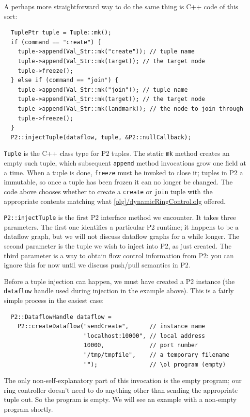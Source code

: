 \documentclass{article}
\begin{document}
A perhaps more straightforward way to do the same thing is C++ code of
this sort:
\begin{verbatim}
  TuplePtr tuple = Tuple::mk();
  if (command == "create") {
    tuple->append(Val_Str::mk("create")); // tuple name
    tuple->append(Val_Str::mk(target)); // the target node
    tuple->freeze();
  } else if (command == "join") {
    tuple->append(Val_Str::mk("join")); // tuple name
    tuple->append(Val_Str::mk(target)); // the target node
    tuple->append(Val_Str::mk(landmark)); // the node to join through
    tuple->freeze();
  }
  P2::injectTuple(dataflow, tuple, &P2::nullCallback);
\end{verbatim}
\texttt{Tuple} is the C++ class type for P2 tuples. The static
\texttt{mk} method creates an empty such tuple, which subsequent
\texttt{append} method invocations grow one field at a time. When a tuple
is done, \texttt{freeze} must be invoked to close it; tuples in P2 a
immutable, so once a tuple has been frozen it can no longer be changed.
The code above chooses whether to create a \lstinline$create$ or
\lstinline$join$ tuple with the appropriate contents matching what
\url{[olg]/dynamicRingControl.olg} offered.

\texttt{P2::injectTuple} is
the first P2 interface method we encounter. It takes three
parameters. The first one identifies a particular P2 runtime; it happens
to be a dataflow graph, but we will not discuss dataflow graphs for a
while longer.  The second parameter is the tuple we wish to inject into
P2, as just created. The third parameter is a way to obtain flow control
information from P2: you can ignore this for now until we discuss
push/pull semantics in P2.

Before a tuple injection can happen, we must have created a P2 instance
(the \texttt{dataflow} handle used during injection in the example
above). This is a fairly simple process in the easiest case:
\begin{verbatim}
  P2::DataflowHandle dataflow =
    P2::createDataflow("sendCreate",      // instance name
                       "localhost:10000", // local address
                       10000,             // port number
                       "/tmp/tmpfile",    // a temporary filename
                       "");               // \ol program (empty)
\end{verbatim}
The only non-self-explanatory part of this invocation is the empty
\ol program; our ring controller doesn't need to do anything other
than sending the appropriate tuple out. So the \ol program is
empty. We will see an example with a non-empty \ol program shortly.
\end{document}
